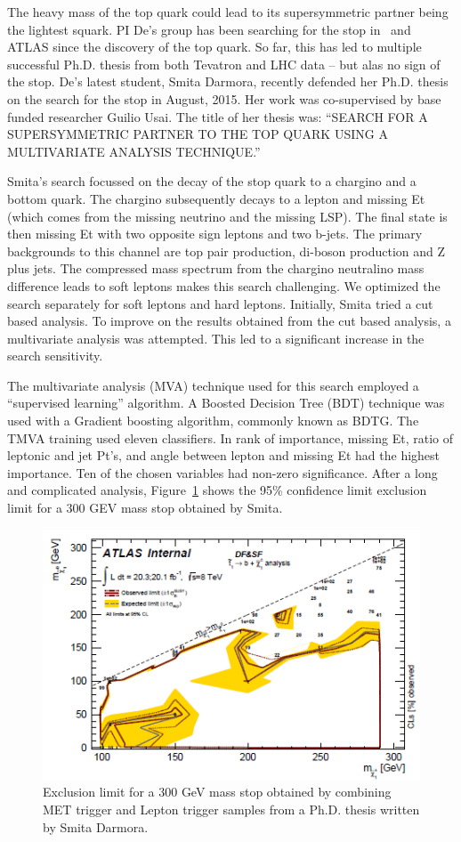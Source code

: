 
The heavy mass of the top quark could lead to its supersymmetric partner being the lightest squark. PI De's group has been searching for the stop in \ and ATLAS since the discovery of the top quark. So far, this has led to multiple successful Ph.D. thesis from both Tevatron and LHC data -- but alas no sign of the stop. De's latest student, Smita Darmora, recently defended her Ph.D. thesis on the search for the stop in August, 2015. Her work was co-supervised by base funded researcher Guilio Usai. The title of her thesis was: ``SEARCH FOR A SUPERSYMMETRIC PARTNER TO THE TOP QUARK USING A MULTIVARIATE ANALYSIS TECHNIQUE.'' 

Smita's search focussed on the decay of the stop quark to a chargino and a bottom quark. The chargino subsequently decays to a lepton and missing Et (which comes from the missing neutrino and the missing LSP). The final state is then missing Et with two opposite sign leptons and two b-jets. The primary backgrounds to this channel are top pair production, di-boson production and Z plus jets. The compressed mass spectrum from the chargino neutralino mass difference leads to soft leptons makes this search challenging. We optimized the search separately for soft leptons and hard leptons. Initially, Smita tried a cut based analysis. To improve on the results obtained from the cut based analysis, a multivariate analysis was attempted. This led to a significant increase in the search sensitivity.

The multivariate analysis (MVA) technique used for this search employed a ``supervised learning'' algorithm. A Boosted Decision Tree (BDT) technique was used with a Gradient boosting algorithm, commonly known as BDTG. The TMVA training used eleven classifiers. In rank of importance, missing Et, ratio of leptonic and jet Pt's, and angle between lepton and missing Et had the highest importance. Ten of the chosen variables had non-zero significance. After a long and complicated analysis, 
Figure~\ref{smita_limit} shows the 95\% confidence limit exclusion limit for a 300 GEV mass stop obtained by Smita.

\begin{figure}[hbt]
\begin{center}
  \includegraphics[width=5in]{De/smita_limit.png}
  \caption{Exclusion limit for a 300 GeV mass stop obtained by combining MET trigger and Lepton trigger samples from a Ph.D.  thesis written by Smita Darmora.}
  \label{smita_limit}
\end{center}
\end{figure}
